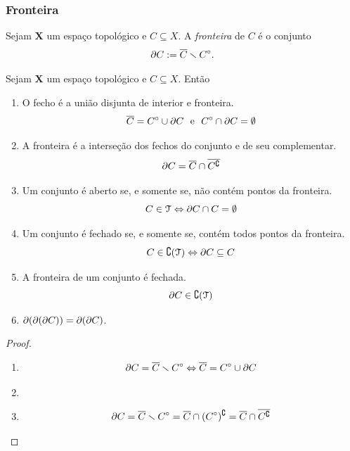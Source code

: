 \subsubsection{Fronteira}

\begin{definition}
	Sejam $\bm X$ um espaço topológico e $C \subseteq X$. A \emph{fronteira} de $C$ é o conjunto
	\begin{equation*}
	\partial{C} := \overline{C} \smallsetminus {C}^\circ.
	\end{equation*}
\end{definition}

\begin{proposition}
	Sejam $\bm X$ um espaço topológico e $C \subseteq X$. Então
	\begin{enumerate}
	\item O fecho é a união disjunta de interior e fronteira.
	\begin{equation*}
	\overline{C} = {C}^\circ \cup \partial{C} \text{\ \ e\ \ } {C}^\circ \cap \partial{C} = \emptyset
	\end{equation*}
	\item A fronteira é a interseção dos fechos do conjunto e de seu complementar.
	\begin{equation*}
	\partial{C} = \overline{C} \cap \overline{C^\complement}
	\end{equation*}
	\item Um conjunto é aberto se, e somente se, não contém pontos da fronteira.
	\begin{equation*}
	C \in \mathcal{T} \Leftrightarrow \partial{C} \cap C = \emptyset
	\end{equation*}
	\item Um conjunto é fechado se, e somente se, contém todos pontos da fronteira.
	\begin{equation*}
	C \in \complement(\mathcal{T}) \Leftrightarrow \partial{C} \subseteq C
	\end{equation*}
	\item A fronteira de um conjunto é fechada.
	\begin{equation*}
	\partial{C} \in \complement(\mathcal{T})
	\end{equation*}
	\item $\partial{(\partial{(\partial{C})})} = \partial{(\partial{C})}$.
	\end{enumerate}
\end{proposition}
\begin{proof}
	\begin{enumerate}
	\item
	\begin{equation*}
	\partial{C} = \overline{C} \smallsetminus {C}^\circ \Leftrightarrow \overline{C} = {C}^\circ \cup \partial{C}
	\end{equation*}
	\item
	\item 
	\begin{equation*}
	\partial{C} = \overline{C} \smallsetminus {C}^\circ = \overline{C} \cap ({C}^\circ)^\complement = \overline{C} \cap \overline{C^\complement}
	\end{equation*}
	\end{enumerate}
\end{proof}

